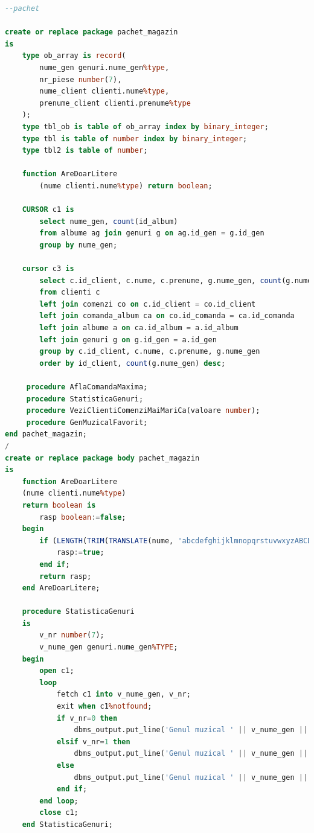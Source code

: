 \documentclass{article}
\begin{document}
 \begin{lstlisting}[language=SQL, title=Cerinta 13]
 --pachet

create or replace package pachet_magazin
is
    type ob_array is record(
        nume_gen genuri.nume_gen%type,
        nr_piese number(7),
        nume_client clienti.nume%type,
        prenume_client clienti.prenume%type
    );
    type tbl_ob is table of ob_array index by binary_integer;
    type tbl is table of number index by binary_integer;
    type tbl2 is table of number;
    
    function AreDoarLitere
        (nume clienti.nume%type) return boolean;

    CURSOR c1 is
        select nume_gen, count(id_album)
        from albume ag join genuri g on ag.id_gen = g.id_gen
        group by nume_gen;
        
    cursor c3 is
        select c.id_client, c.nume, c.prenume, g.nume_gen, count(g.nume_gen)
        from clienti c 
        left join comenzi co on c.id_client = co.id_client
        left join comanda_album ca on co.id_comanda = ca.id_comanda
        left join albume a on ca.id_album = a.id_album
        left join genuri g on g.id_gen = a.id_gen
        group by c.id_client, c.nume, c.prenume, g.nume_gen
        order by id_client, count(g.nume_gen) desc;
        
     procedure AflaComandaMaxima;
     procedure StatisticaGenuri;
     procedure VeziClientiComenziMaiMariCa(valoare number);
     procedure GenMuzicalFavorit; 
end pachet_magazin;
/
create or replace package body pachet_magazin
is
    function AreDoarLitere
    (nume clienti.nume%type)
    return boolean is 
        rasp boolean:=false;
    begin
        if (LENGTH(TRIM(TRANSLATE(nume, 'abcdefghijklmnopqrstuvwxyzABCDEFGHIJKLMNOPQRSTUVWXYZ', ' '))) is null) then
            rasp:=true;
        end if;
        return rasp;
    end AreDoarLitere;
    
    procedure StatisticaGenuri
    is
        v_nr number(7);
        v_nume_gen genuri.nume_gen%TYPE;
    begin
        open c1;
        loop
            fetch c1 into v_nume_gen, v_nr;
            exit when c1%notfound;
            if v_nr=0 then
                dbms_output.put_line('Genul muzical ' || v_nume_gen || ' nu are niciun album disponibil');
            elsif v_nr=1 then
                dbms_output.put_line('Genul muzical ' || v_nume_gen || ' are un album disponibil');
            else
                dbms_output.put_line('Genul muzical ' || v_nume_gen || ' are ' || v_nr || ' albume disponibile');
            end if;
        end loop;
        close c1;
    end StatisticaGenuri;
    

\end{lstlisting}
\end{document}
